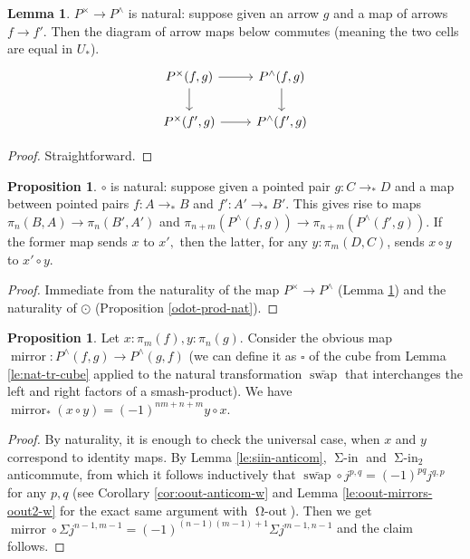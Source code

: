 \documentclass{amsart}
\theoremstyle{definition}
\newtheorem{prp}[theorem]{Proposition}
\newtheorem{lem}[theorem]{Lemma}
\newcommand{\swap}{\bar{\operatorname{swap}}}
\newcommand{\pto}{\to_*}
\newcommand{\oout}{\operatorname{\Omega-out}}
\newcommand{\siin}{\operatorname{\Sigma-in}}
\newcommand{\mir}{\operatorname{mirror}}
\begin{document}
\begin{lem}\label{le:cross-to-wedge-natural}
    $P^\times \to P^\wedge$ is natural: suppose given an arrow $g$ and a map of arrows $f \to f'$. Then the diagram of arrow maps below commutes (meaning the two cells are equal in $U_*$).
    \[\begin{tikzcd}
    	{P^\times(f,g)} & {P^\wedge(f,g)} \\
    	{P^\times(f',g)} & {P^\wedge(f',g)}
    	\arrow[from=1-1, to=1-2]
    	\arrow[from=1-1, to=2-1]
    	\arrow[from=1-2, to=2-2]
    	\arrow[from=2-1, to=2-2]
    \end{tikzcd}\]
\end{lem}
\begin{proof}
    Straightforward.
\end{proof}


\begin{prp}\label{circ-prod-nat}
    $\circ$ is natural: suppose given a pointed pair $g: C \pto D$ and a map between pointed pairs $f: A \pto B$ and $f': A' \pto B'$. This gives rise to maps $\pi_n(B,A) \to \pi_n(B',A')$ and
    $\pi_{n+m}(P^{\wedge}(f,g)) \to \pi_{n+m}(P^{\wedge}(f',g))$. If the former map sends $x$ to $x',$ then the latter, for any $y : \pi_m(D,C)$, sends $x \circ y$ to $x' \circ y$.
\end{prp}
\begin{proof}
Immediate from the naturality of the map $P^\times \to P^\wedge$ (Lemma \ref{le:cross-to-wedge-natural}) and the naturality of $\odot$ (Proposition \ref{odot-prod-nat}).
\end{proof}



\begin{prp}\label{pr:graded-comm}
    Let $x: \pi_m(f), y: \pi_n(g)$. Consider the obvious map $\mir: P^\wedge(f, g) \to P^\wedge(g,f)$ (we can define it as $\square$ of the cube from Lemma \ref{le:nat-tr-cube} applied to the natural transformation $\swap$ that interchanges the left and right factors of a smash-product). We have $\mir_*(x \circ y) = (-1)^{nm+n+m} y \circ x$.
\end{prp}
\begin{proof}
    By naturality, it is enough to check the universal case, when $x$ and $y$ correspond to identity maps. By Lemma \ref{le:siin-anticom}, $\siin$ and $\siin_2$ anticommute, from which it follows inductively that $\swap \circ j^{p,q} = (-1)^{pq} j^{q,p}$ for any $p,q$ (see Corollary \ref{cor:oout-anticom-w} and Lemma \ref{le:oout-mirrors-oout2-w} for the exact same argument with $\oout$). Then we get $\mir \circ \Sigma j^{n-1,m-1} = (-1)^{(n-1)(m-1)+1}\Sigma j^{m-1,n-1}$ and the claim follows.
\end{proof}
\end{document}
